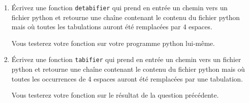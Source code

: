 \documentclass[10pt,a4paper]{sujets-exercices}
\begin{document}

\begin{enumerate}
\item Écrivez une fonction \verb!detabifier! qui prend en entrée un chemin vers un fichier python et retourne une chaîne contenant le contenu du fichier python mais où toutes les tabulations auront été remplacées par 4 espaces.

Vous testerez votre fonction sur votre programme python lui-même.

\item Écrivez une fonction \verb!tabifier! qui prend en entrée un chemin vers un fichier python et retourne une chaîne contenant le contenu du fichier python mais où toutes les occurrences de 4 espaces auront été remplacées par une tabulation.

Vous testerez votre fonction sur le résultat de la question précédente.
\end{enumerate}
\end{document}
